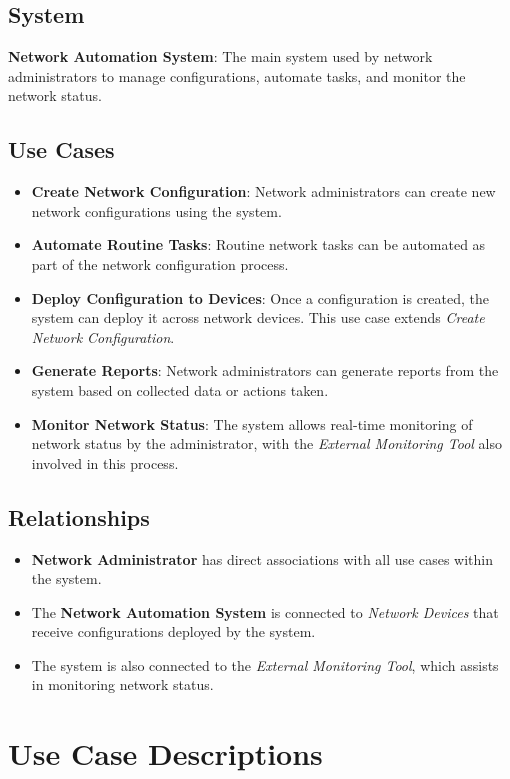 \subsection{System}
\textbf{Network Automation System}: The main system used by network administrators to manage configurations, automate tasks, and monitor the network status.

\subsection{Use Cases}
\begin{itemize}
    \item \textbf{Create Network Configuration}: Network administrators can create new network configurations using the system.
    \item \textbf{Automate Routine Tasks}: Routine network tasks can be automated as part of the network configuration process.
    \item \textbf{Deploy Configuration to Devices}: Once a configuration is created, the system can deploy it across network devices. This use case extends \textit{Create Network Configuration}.
    \item \textbf{Generate Reports}: Network administrators can generate reports from the system based on collected data or actions taken.
    \item \textbf{Monitor Network Status}: The system allows real-time monitoring of network status by the administrator, with the \textit{External Monitoring Tool} also involved in this process.
\end{itemize}

\subsection{Relationships}
\begin{itemize}
    \item \textbf{Network Administrator} has direct associations with all use cases within the system.
    \item The \textbf{Network Automation System} is connected to \textit{Network Devices} that receive configurations deployed by the system.
    \item The system is also connected to the \textit{External Monitoring Tool}, which assists in monitoring network status.
\end{itemize}


\section{Use Case Descriptions}

